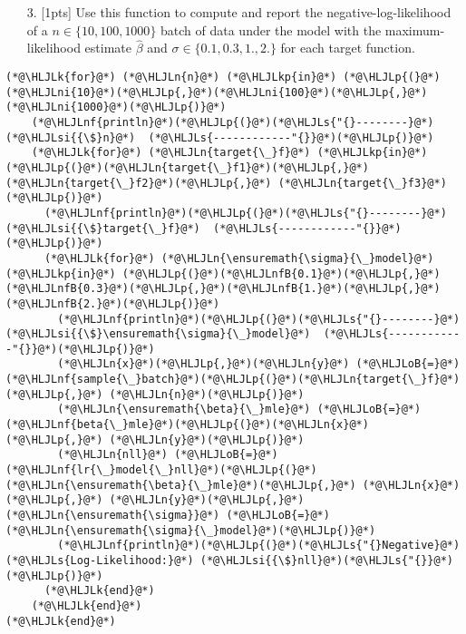 \documentclass[12pt,a4paper]{article}
\newcommand{\HLJLk}[1]{\textcolor[RGB]{148,91,176}{\textbf{#1}}}
\newcommand{\HLJLkp}[1]{\textcolor[RGB]{148,91,176}{\textbf{#1}}}
\newcommand{\HLJLn}[1]{#1}
\newcommand{\HLJLnf}[1]{\textcolor[RGB]{66,102,213}{#1}}
\newcommand{\HLJLs}[1]{\textcolor[RGB]{201,61,57}{#1}}
\newcommand{\HLJLsi}[1]{#1}
\newcommand{\HLJLnfB}[1]{\textcolor[RGB]{59,151,46}{#1}}
\newcommand{\HLJLni}[1]{\textcolor[RGB]{59,151,46}{#1}}
\newcommand{\HLJLoB}[1]{\textcolor[RGB]{102,102,102}{\textbf{#1}}}
\newcommand{\HLJLp}[1]{#1}
\begin{document}
\begin{itemize}
\item[3. ] [1pts] Use this function to compute and report the negative-log-likelihood of a $n\in \{10,100,1000\}$ batch of data  under the model with the maximum-likelihood estimate $\hat\beta$ and $\sigma \in \{0.1,0.3,1.,2.\}$ for each target function.

\end{itemize}

\begin{lstlisting}
(*@\HLJLk{for}@*) (*@\HLJLn{n}@*) (*@\HLJLkp{in}@*) (*@\HLJLp{(}@*)(*@\HLJLni{10}@*)(*@\HLJLp{,}@*)(*@\HLJLni{100}@*)(*@\HLJLp{,}@*)(*@\HLJLni{1000}@*)(*@\HLJLp{)}@*)
    (*@\HLJLnf{println}@*)(*@\HLJLp{(}@*)(*@\HLJLs{"{}--------}@*)  (*@\HLJLsi{{\$}n}@*)  (*@\HLJLs{------------"{}}@*)(*@\HLJLp{)}@*)
    (*@\HLJLk{for}@*) (*@\HLJLn{target{\_}f}@*) (*@\HLJLkp{in}@*) (*@\HLJLp{(}@*)(*@\HLJLn{target{\_}f1}@*)(*@\HLJLp{,}@*)(*@\HLJLn{target{\_}f2}@*)(*@\HLJLp{,}@*) (*@\HLJLn{target{\_}f3}@*)(*@\HLJLp{)}@*)
      (*@\HLJLnf{println}@*)(*@\HLJLp{(}@*)(*@\HLJLs{"{}--------}@*)  (*@\HLJLsi{{\$}target{\_}f}@*)  (*@\HLJLs{------------"{}}@*)(*@\HLJLp{)}@*)
      (*@\HLJLk{for}@*) (*@\HLJLn{\ensuremath{\sigma}{\_}model}@*) (*@\HLJLkp{in}@*) (*@\HLJLp{(}@*)(*@\HLJLnfB{0.1}@*)(*@\HLJLp{,}@*)(*@\HLJLnfB{0.3}@*)(*@\HLJLp{,}@*)(*@\HLJLnfB{1.}@*)(*@\HLJLp{,}@*)(*@\HLJLnfB{2.}@*)(*@\HLJLp{)}@*)
        (*@\HLJLnf{println}@*)(*@\HLJLp{(}@*)(*@\HLJLs{"{}--------}@*)  (*@\HLJLsi{{\$}\ensuremath{\sigma}{\_}model}@*)  (*@\HLJLs{------------"{}}@*)(*@\HLJLp{)}@*)
        (*@\HLJLn{x}@*)(*@\HLJLp{,}@*)(*@\HLJLn{y}@*) (*@\HLJLoB{=}@*) (*@\HLJLnf{sample{\_}batch}@*)(*@\HLJLp{(}@*)(*@\HLJLn{target{\_}f}@*)(*@\HLJLp{,}@*) (*@\HLJLn{n}@*)(*@\HLJLp{)}@*)
        (*@\HLJLn{\ensuremath{\beta}{\_}mle}@*) (*@\HLJLoB{=}@*) (*@\HLJLnf{beta{\_}mle}@*)(*@\HLJLp{(}@*)(*@\HLJLn{x}@*)(*@\HLJLp{,}@*) (*@\HLJLn{y}@*)(*@\HLJLp{)}@*)
        (*@\HLJLn{nll}@*) (*@\HLJLoB{=}@*) (*@\HLJLnf{lr{\_}model{\_}nll}@*)(*@\HLJLp{(}@*)(*@\HLJLn{\ensuremath{\beta}{\_}mle}@*)(*@\HLJLp{,}@*) (*@\HLJLn{x}@*)(*@\HLJLp{,}@*) (*@\HLJLn{y}@*)(*@\HLJLp{,}@*) (*@\HLJLn{\ensuremath{\sigma}}@*) (*@\HLJLoB{=}@*) (*@\HLJLn{\ensuremath{\sigma}{\_}model}@*)(*@\HLJLp{)}@*)
        (*@\HLJLnf{println}@*)(*@\HLJLp{(}@*)(*@\HLJLs{"{}Negative}@*) (*@\HLJLs{Log-Likelihood:}@*) (*@\HLJLsi{{\$}nll}@*)(*@\HLJLs{"{}}@*)(*@\HLJLp{)}@*)
      (*@\HLJLk{end}@*)
    (*@\HLJLk{end}@*)
(*@\HLJLk{end}@*)
\end{lstlisting}
\end{document}
